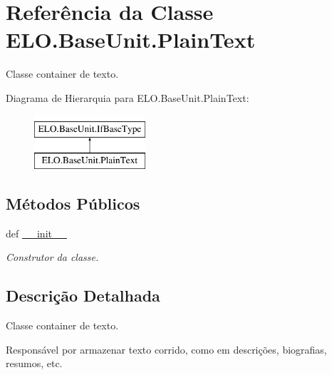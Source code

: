 \hypertarget{classELO_1_1BaseUnit_1_1PlainText}{\section{Referência da Classe E\-L\-O.\-Base\-Unit.\-Plain\-Text}
\label{classELO_1_1BaseUnit_1_1PlainText}
}


Classe container de texto.  


Diagrama de Hierarquia para E\-L\-O.\-Base\-Unit.\-Plain\-Text\-:\begin{figure}[H]
\begin{center}
\leavevmode
\includegraphics[height=2.000000cm]{d4/d2d/classELO_1_1BaseUnit_1_1PlainText}
\end{center}
\end{figure}
\subsection*{Métodos Públicos}
\begin{DoxyCompactItemize}
\item 
def \hyperlink{classELO_1_1BaseUnit_1_1PlainText_a2cd4f19585b5e8e8279f8052307d031f}{\-\_\-\-\_\-init\-\_\-\-\_\-}
\begin{DoxyCompactList}\small\item\em Construtor da classe. \end{DoxyCompactList}\end{DoxyCompactItemize}


\subsection{Descrição Detalhada}
Classe container de texto. 

Responsável por armazenar texto corrido, como em descrições, biografias, resumos, etc. 

